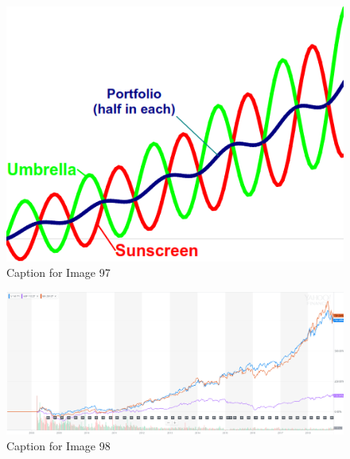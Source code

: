 \documentclass{article}
\begin{document}
\vspace{10pt}

\begin{figure}[!htb]
    \centering
    \includegraphics[width=\textwidth]{imgs/97.png}
    \caption{Caption for Image 97}
\end{figure}

\vspace{10pt}

\begin{figure}[!htb]
    \centering
    \includegraphics[width=\textwidth]{imgs/98.png}
    \caption{Caption for Image 98}
\end{figure}

\vspace{10pt}
\end{document}
